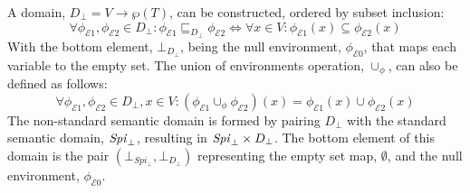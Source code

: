 \documentclass[10pt,a4paper,final,oneside,fleqn]{book}
\begin{document}
A domain, $D_\bot=V\to\wp(T)$, can be constructed, ordered by subset inclusion:
\[\forall\phi_{\mathcal{E}1},\phi_{\mathcal{E}2}\in D_\bot: \phi_{\mathcal{E}1}\sqsubseteq_{D_\bot}\phi_{\mathcal{E}2}\Leftrightarrow\forall x\in V:\phi_{\mathcal{E}1}(x)\subseteq\phi_{\mathcal{E}2}(x)\]
With the bottom element, $\bot_{D_\bot}$, being the null environment, $\phi_{\mathcal{E}0}$, that maps each variable to the empty set. The union of environments operation, $\cup_\phi$, can also be defined as follows:
\[\forall\phi_{\mathcal{E}1},\phi_{\mathcal{E}2}\in D_\bot,x\in V: (\phi_{\mathcal{E}1}\cup_\phi\phi_{\mathcal{E}2})(x)=\phi_{\mathcal{E}1}(x)\cup\phi_{\mathcal{E}2}(x)\]
The non-standard semantic domain is formed by pairing $D_\bot$ with the standard semantic domain, $\mbox{{\itshape Spi\/}}_\bot$, resulting in $\mbox{{\itshape Spi\/}}_\bot\times D_\bot$.  The bottom element of this domain is the pair $(\bot_{Spi_\bot},\bot_{D_\bot})$ representing the empty set map, $\emptyset$, and the null environment, $\phi_{\mathcal{E}0}$.
\end{document}
